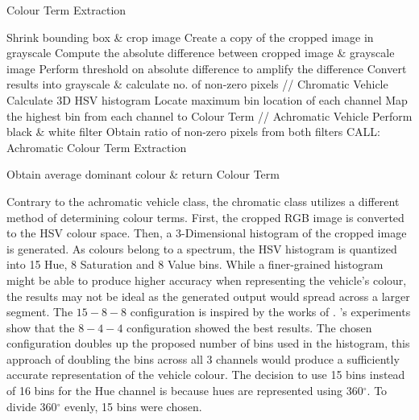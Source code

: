  \begin{algorithm}[!ht]
  \caption{Colour Term Extraction}
  \label{algo:colorExtract}
  \begin{algorithmic}[1]
        \STATE Shrink bounding box \& crop image
        \STATE Create a copy of the cropped image in grayscale
        \STATE Compute the absolute difference between cropped image \& grayscale image
        \STATE Perform threshold on absolute difference to amplify the difference
        \STATE Convert results into grayscale \& calculate no. of non-zero pixels
                \STATE // Chromatic Vehicle
                \STATE Calculate 3D HSV histogram
                \STATE Locate maximum bin location of each channel
                \STATE Map the highest bin from each channel to Colour Term
            \ELSE
                \STATE // Achromatic Vehicle
                \STATE Perform black \& white filter
                \STATE Obtain ratio of non-zero pixels from both filters
                \STATE CALL: Achromatic Colour Term Extraction
            \ENDIF

    \ENDFOR
    \STATE Obtain average dominant colour \& return Colour Term
  \end{algorithmic}
\end{algorithm}

Contrary to the achromatic vehicle class, the chromatic class utilizes a different method of determining colour terms.
First, the cropped RGB image is converted to the HSV colour space. Then, a 3-Dimensional histogram of the cropped image is generated.
As colours belong to a spectrum, the HSV histogram is quantized into 15 Hue, 8 Saturation and 8 Value bins.
While a finer-grained histogram might be able to produce higher accuracy when representing the vehicle's colour, the results may not be ideal as the generated output would spread across a larger segment.
The $15-8-8$ configuration is inspired by the works of \cite{kim2008deciding, castanon2016retrieval}. 's experiments show that the $8-4-4$ configuration showed the best results.
The chosen configuration doubles up the proposed number of bins used in the histogram, this approach of doubling the bins across all 3 channels would produce a sufficiently accurate representation of the vehicle colour.
The decision to use 15 bins instead of 16 bins for the Hue channel is because hues are represented using 360$^{\circ}$. To divide 360$^{\circ}$ evenly, 15 bins were chosen.


